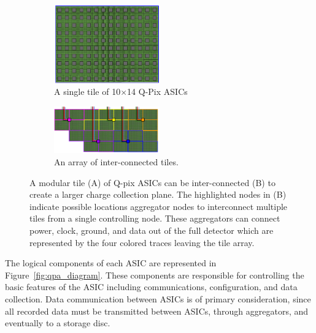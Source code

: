 \begin{figure}[]
\centering
\begin{subfigure}{.5\textwidth}
  \centering
  \includegraphics[width=0.5\textwidth]{images/single_tile_qpix.png}
  \caption{A single tile of 10$\times$14 Q-Pix ASICs}
\end{subfigure}%
\begin{subfigure}{.5\textwidth}
  \centering
  \includegraphics[width=0.5\textwidth]{images/array_of_tiles_qpix.png}
  \caption{An array of inter-connected tiles.}
\end{subfigure}
\caption{A modular tile (A) of Q-pix ASICs can be inter-connected (B) to create a larger charge collection plane. 
The highlighted nodes in (B) indicate possible locations aggregator nodes to interconnect multiple tiles from a single controlling node.
These aggregators can connect power, clock, ground, and data out of the full detector which are represented by the four colored traces leaving the tile array.
}
\label{fig:qpix_tile_introduction}
\end{figure}

The logical components of each ASIC are represented in Figure~\ref{fig:qpa_diagram}.
These components are responsible for controlling the basic features of the ASIC including communications, configuration, and data collection.
Data communication between ASICs is of primary consideration, since all recorded data must be transmitted between ASICs, through aggregators, and eventually to a storage disc.

